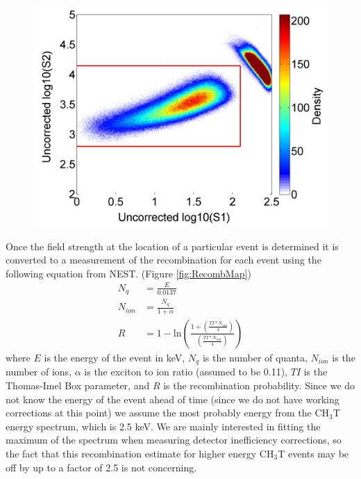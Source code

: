 \begin{figure}[!h]
\includegraphics[scale=0.6]{Run04Corrections/TritiumDetectorInefficiency_Cuts.png}
 \label{fig:TritBoxCut}
\end{figure}


Once the field strength at the location of a particular event is determined it is converted to a measurement of the recombination for each event using the following equation from NEST. (Figure \ref{fig:RecombMap}) 
\begin{align}
N_q &= \frac{E}{0.0137} \label{NqEq} \\
N_{ion} &= \frac{N_q}{1+\alpha} \label{NionEq} \\
R &= 1-\mbox{ln} \left( \frac{1+(\frac{TI*N_{ion}}{4})}{(\frac{TI*N_{ion}}{4})} \right)
\end{align}
where $E$ is the energy of the event in keV, $N_q$ is the number of quanta, $N_{ion}$ is the number of ions, $\alpha$ is the exciton to ion ratio (assumed to be 0.11), $TI$ is the Thomas-Imel Box parameter, and $R$ is the recombination probability.  Since we do not know the energy of the event ahead of time (since we do not have working corrections at this point) we assume the most probably energy from the CH$_3$T energy spectrum, which is 2.5 keV.  We are mainly interested in fitting the maximum of the spectrum when measuring detector inefficiency corrections, so the fact that this recombination estimate for higher energy CH$_3$T events may be off by up to a factor of 2.5 is not concerning.  

